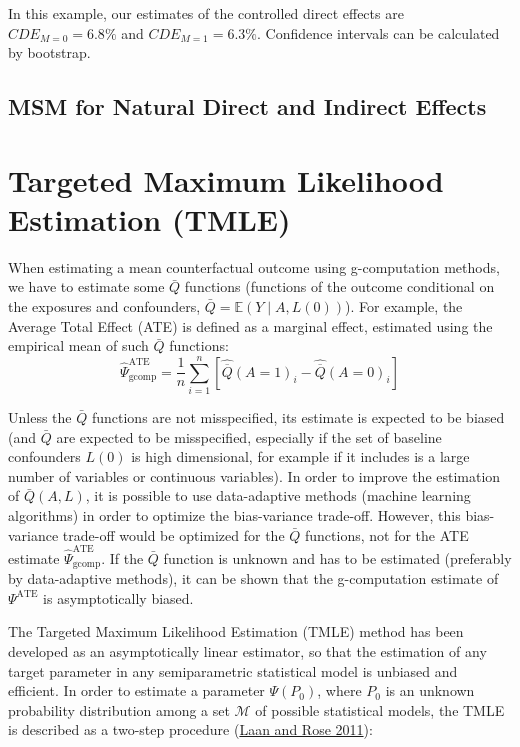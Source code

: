 \documentclass[
]{book}
\begin{document}
In this example, our estimates of the controlled direct effects are \(CDE_{M=0} = 6.8\%\) and \(CDE_{M=1} = 6.3\%\). Confidence intervals can be calculated by bootstrap.

\hypertarget{msm_NDE_NIE_paragraph}{%
\section{MSM for Natural Direct and Indirect Effects}\label{msm_NDE_NIE_paragraph}}

\hypertarget{chap_tmle}{%
\chapter{Targeted Maximum Likelihood Estimation (TMLE)}\label{chap_tmle}}

When estimating a mean counterfactual outcome using g-computation methods, we have to estimate some \(\bar{Q}\) functions (functions of the outcome conditional on the exposures and confounders, \(\bar{Q}=\mathbb{E}\left(Y\mid A,L(0)\right)\)). For example, the Average Total Effect (ATE) is defined as a marginal effect, estimated using the empirical mean of such \(\bar{Q}\) functions:
\begin{equation*}
\hat{\Psi}^{\text{ATE}}_{\text{gcomp}} = \frac{1}{n} \sum_{i=1}^n \left[ \hat{\overline{Q}}(A=1)_i - \hat{\overline{Q}}(A=0)_i \right]
\end{equation*}

Unless the \(\bar{Q}\) functions are not misspecified, its estimate is expected to be biased (and \(\bar{Q}\) are expected to be misspecified, especially if the set of baseline confounders \(L(0)\) is high dimensional, for example if it includes is a large number of variables or continuous variables). In order to improve the estimation of \(\bar{Q}(A,L)\), it is possible to use data-adaptive methods (machine learning algorithms) in order to optimize the bias-variance trade-off. However, this bias-variance trade-off would be optimized for the \(\bar{Q}\) functions, not for the ATE estimate \(\hat{\Psi}^\text{ATE}_\text{gcomp}\). If the \(\bar{Q}\) function is unknown and has to be estimated (preferably by data-adaptive methods), it can be shown that the g-computation estimate of \(\Psi^\text{ATE}\) is asymptotically biased.

The Targeted Maximum Likelihood Estimation (TMLE) method has been developed as an asymptotically linear estimator, so that the estimation of any target parameter in any semiparametric statistical model is unbiased and efficient. In order to estimate a parameter \(\Psi(P_0)\), where \(P_0\) is an unknown probability distribution among a set \(\mathcal{M}\) of possible statistical models, the TMLE is described as a two-step procedure (\protect\hyperlink{ref-vanderlaan_book2011}{Laan and Rose 2011}):
\end{document}
